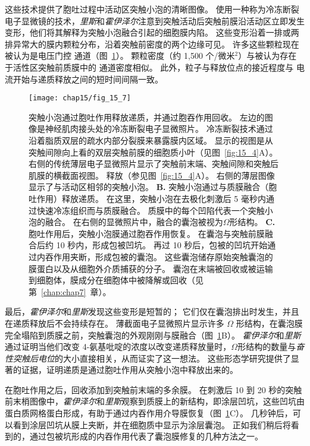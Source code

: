 这些技术提供了胞吐过程中活动区突触小泡的清晰图像。 
使用一种称为冷冻断裂电子显微镜的技术，\textit{里斯}和\textit{霍伊泽尔}注意到突触活动后突触前膜沿活动区立即发生变形，他们将其解释为突触小泡融合引起的细胞膜内陷。 
这些变形沿着一排或两排异常大的膜内颗粒分布，沿着突触前密度的两个边缘可见。
许多这些颗粒现在被认为是电压门控  通道（图~\ref{fig:15_7}）。
颗粒密度（约 1,500 个/微米$ ^2 $）与被认为存在于活性区突触前质膜中的  通道密度相似。
此外，粒子与释放位点的接近程度与  电流开始与递质释放之间的短时间间隔一致。


\begin{figure}[htbp]
	\centering
	\texttt{[image: chap15/fig\_15\_7]}
	\caption{突触小泡通过胞吐作用释放递质，并通过胞吞作用回收。
		左边的图像是神经肌肉接头处的冷冻断裂电子显微照片。
		冷冻断裂技术通过沿着脂质双层的疏水内部分裂膜来暴露膜内区域。
		显示的视图是从突触间隙向上看的双层突触前膜的细胞质小叶（见图~\ref{fig:15_4}A）。
		右侧的传统薄层电子显微照片显示了突触前末端、突触间隙和突触后肌膜的横截面视图\cite{heuser1981structural}。
		释放（参见图~\ref{fig:15_4}A）。
		右侧的薄层图像显示了与活动区相邻的突触小泡。
		\textbf{B.} 突触小泡通过与质膜融合（胞吐作用）释放递质。
		在这里，突触小泡在去极化刺激后 5 毫秒内通过快速冷冻组织而与质膜融合。
		质膜中的每个凹陷代表一个突触小泡的融合。
		在右侧的显微照片中，融合的囊泡被视为$\Omega$形结构。
		\textbf{C.} 胞吐作用后，突触小泡膜通过胞吞作用恢复。
		在囊泡与突触前膜融合后约 10 秒内，形成包被凹坑。
		再过 10 秒后，包被的凹坑开始通过内吞作用夹断，形成包被的囊泡。
		这些囊泡储存原始突触囊泡的膜蛋白以及从细胞外介质捕获的分子。
		囊泡在末端被回收或被运输到细胞体，膜成分在细胞体中被降解或回收（见第~\ref{chap:chap7}~章）。}
	\label{fig:15_7}
\end{figure}



最后，\textit{霍伊泽尔}和\textit{里斯}发现这些变形是短暂的；
它们仅在囊泡排出时发生，并且在递质释放后不会持续存在。
薄截面电子显微照片显示许多 $\Omega$ 形结构，在囊泡膜完全塌陷到质膜之前，突触囊泡的外观刚刚与膜融合（图~\ref{fig:15_7}B）。
\textit{霍伊泽尔}和\textit{里斯}通过证明当他们改变 4-氨基吡啶的浓度以改变递质释放量时，$\Omega$形结构的数量与\textit{奋性突触后电位}的大小直接相关，从而证实了这一想法。
这些形态学研究提供了显著的证据，证明递质是通过胞吐作用从突触小泡中释放出来的。


在胞吐作用之后，回收添加到突触前末端的多余膜。
在刺激后 10 到 20 秒的突触前末梢图像中，\textit{霍伊泽尔}和\textit{里斯}观察到质膜上的新结构，即涂层凹坑，这些凹坑由蛋白质网格蛋白形成，有助于通过内吞作用介导膜恢复（图~\ref{fig:15_7}C）。
几秒钟后，可以看到涂层凹坑从膜上夹断，并在细胞质中显示为涂层囊泡。
正如我们稍后将看到的，通过包被坑形成的内吞作用代表了囊泡膜修复的几种方法之一。



